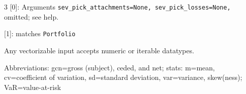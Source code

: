 \begin{multicols*}{3}
[0]: Arguments \texttt{sev\_pick\_attachments=None, sev\_pick\_losses=None, } omitted; see help. 

[1]: matches \texttt{Portfolio} 

Any vectorizable input accepts numeric or iterable datatypes.  

Abbreviations: gcn=gross (subject), ceded, and net; stats: m=mean, cv=coefficient of variation, sd=standard deviation, var=variance, skew(ness); VaR=value-at-risk


\makefooter

\end{multicols*}


